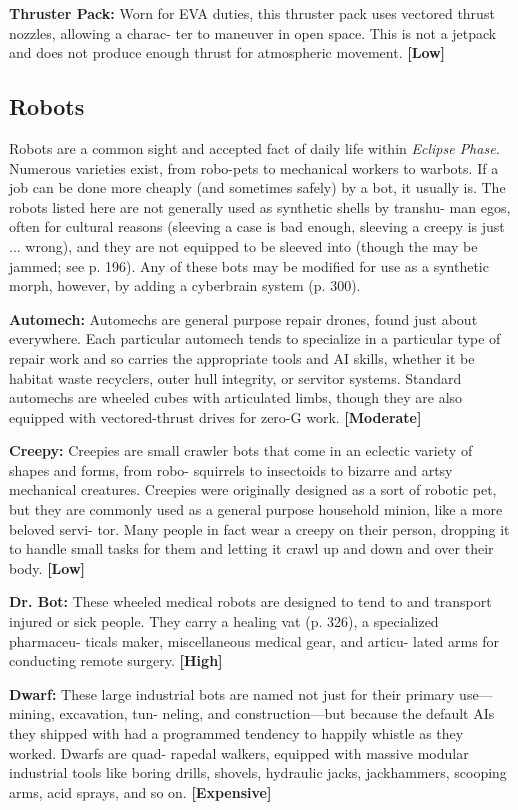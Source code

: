 \textbf{Thruster Pack:} Worn for EVA duties, this thruster 
pack uses vectored thrust nozzles, allowing a charac-
ter to maneuver in open space. This is not a jetpack 
and does not produce enough thrust for atmospheric 
movement. \textbf{[Low]}

\subsection{Robots}

Robots are a common sight and accepted fact of daily 
life within \textit{Eclipse Phase.} Numerous varieties exist, 
from robo-pets to mechanical workers to warbots. 
If a job can be done more cheaply (and sometimes 
safely) by a bot, it usually is. The robots listed here 
are not generally used as synthetic shells by transhu-
man egos, often for cultural reasons (sleeving a case 
is bad enough, sleeving a creepy is just ... wrong), and 
they are not equipped to be sleeved into (though the 
may be jammed; see p. 196). Any of these bots may 
be modified for use as a synthetic morph, however, by 
adding a cyberbrain system (p. 300).

\textbf{Automech: }Automechs are general purpose repair 
drones, found just about everywhere. Each particular 
automech tends to specialize in a particular type of 
repair work and so carries the appropriate tools and 
AI skills, whether it be habitat waste recyclers, outer 
hull integrity, or servitor systems. Standard automechs 
are wheeled cubes with articulated limbs, though they 
are also equipped with vectored-thrust drives for 
zero-G work. \textbf{[Moderate]}

\textbf{Creepy: }Creepies are small crawler bots that come 
in an eclectic variety of shapes and forms, from robo-
squirrels to insectoids to bizarre and artsy mechanical 
creatures. Creepies were originally designed as a sort of 
robotic pet, but they are commonly used as a general 
purpose household minion, like a more beloved servi-
tor. Many people in fact wear a creepy on their person, 
dropping it to handle small tasks for them and letting it 
crawl up and down and over their body. \textbf{[Low]}

\textbf{Dr. Bot:} These wheeled medical robots are designed 
to tend to and transport injured or sick people. They 
carry a healing vat (p. 326), a specialized pharmaceu-
ticals maker, miscellaneous medical gear, and articu-
lated arms for conducting remote surgery. \textbf{[High]}

\textbf{Dwarf:} These large industrial bots are named not 
just for their primary use—mining, excavation, tun-
neling, and construction—but because the default 
AIs they shipped with had a programmed tendency 
to happily whistle as they worked. Dwarfs are quad-
rapedal walkers, equipped with massive modular 
industrial tools like boring drills, shovels, hydraulic 
jacks, jackhammers, scooping arms, acid sprays, and 
so on. \textbf{[Expensive]}

